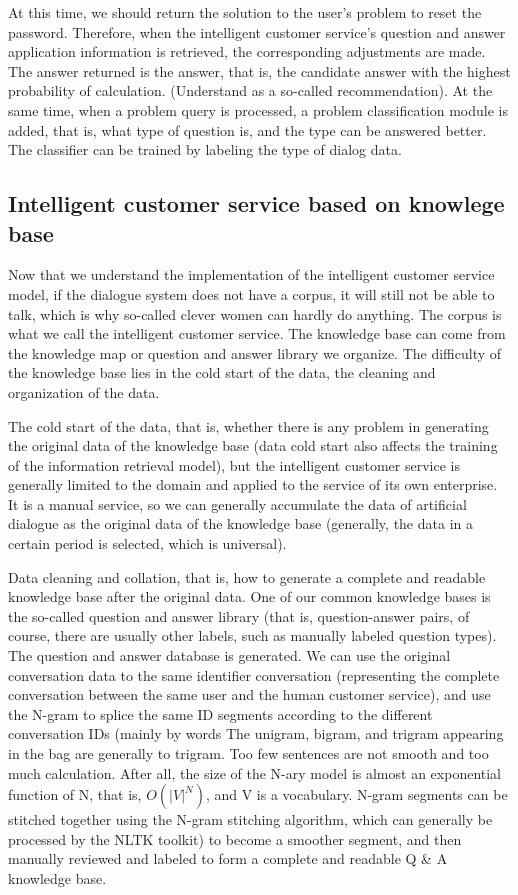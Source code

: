 \documentclass[11pt,en,number]{elegantpaper}
\begin{document}
	At this time, we should return the solution to the user's problem to reset the password. Therefore, when the intelligent customer service's question and answer application information is retrieved, the corresponding adjustments are made. The answer returned is the answer, that is, the candidate answer with the highest probability of calculation. (Understand as a so-called recommendation). At the same time, when a problem query is processed, a problem classification module is added, that is, what type of question is, and the type can be answered better. The classifier can be trained by labeling the type of dialog data.
	
	\subsection{Intelligent customer service based on knowlege base}
	Now that we understand the implementation of the intelligent customer service model, if the dialogue system does not have a corpus, it will still not be able to talk, which is why so-called clever women can hardly do anything. The corpus is what we call the intelligent customer service. The knowledge base can come from the knowledge map or question and answer library we organize. The difficulty of the knowledge base lies in the cold start of the data, the cleaning and organization of the data.
	
	The cold start of the data, that is, whether there is any problem in generating the original data of the knowledge base (data cold start also affects the training of the information retrieval model), but the intelligent customer service is generally limited to the domain and applied to the service of its own enterprise. It is a manual service, so we can generally accumulate the data of artificial dialogue as the original data of the knowledge base (generally, the data in a certain period is selected, which is universal).
	
	Data cleaning and collation, that is, how to generate a complete and readable knowledge base after the original data. One of our common knowledge bases is the so-called question and answer library (that is, question-answer pairs, of course, there are usually other labels, such as manually labeled question types). The question and answer database is generated. We can use the original conversation data to the same identifier conversation (representing the complete conversation between the same user and the human customer service), and use the N-gram to splice the same ID segments according to the different conversation IDs (mainly by words The unigram, bigram, and trigram appearing in the bag are generally to trigram. Too few sentences are not smooth and too much calculation. After all, the size of the N-ary model is almost an exponential function of N, that is, $O (| V | ^ N)$, and V is a vocabulary\cite{8}. N-gram segments can be stitched together using the N-gram stitching algorithm, which can generally be processed by the NLTK toolkit) to become a smoother segment, and then manually reviewed and labeled to form a complete and readable Q \& A knowledge base.
	
\end{document}

